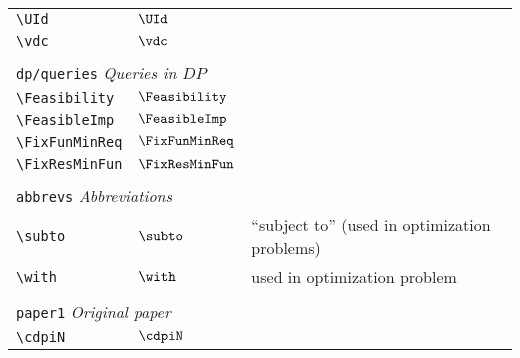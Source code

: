 \begin{longtable}{lll}
  {\color[rgb]{0.5,0.5,0.5}\texttt{\textbackslash UId}}                                                     & $\UId$                     & \\
  {\color[rgb]{0.5,0.5,0.5}\texttt{\textbackslash vdc}}                                                     & $\vdc$                     &                                                         \\
  &                            &                                                         \\
  \multicolumn{3}{l}{{\color[rgb]{0.5,0.5,0.5}\texttt{dp/queries}} \emph{Queries in $DP$}}
  \\
  \hline
  {\color[rgb]{0.5,0.5,0.5}\texttt{\textbackslash Feasibility}}                                             & $\Feasibility$             & \\
  {\color[rgb]{0.5,0.5,0.5}\texttt{\textbackslash FeasibleImp}}                                             & $\FeasibleImp$             & \\
  {\color[rgb]{0.5,0.5,0.5}\texttt{\textbackslash FixFunMinReq}}                                            & $\FixFunMinReq$            & \\
  {\color[rgb]{0.5,0.5,0.5}\texttt{\textbackslash FixResMinFun}}                                            & $\FixResMinFun$            &                                                         \\
  &                            &                                                         \\
  \multicolumn{3}{l}{{\color[rgb]{0.5,0.5,0.5}\texttt{abbrevs}} \emph{Abbreviations}}
  \\
  \hline
  \hline
  {\color[rgb]{0.5,0.5,0.5}\texttt{\textbackslash subto}}                                                   & $\subto$                   & ``subject to'' (used in optimization problems)\\
  {\color[rgb]{0.5,0.5,0.5}\texttt{\textbackslash with}}                                                    & $\with$                    & used in optimization problem                            \\
  &                            &                                                         \\
  \multicolumn{3}{l}{{\color[rgb]{0.5,0.5,0.5}\texttt{paper1}} \emph{Original paper}}
  \\
  \hline
  \hline
  {\color[rgb]{0.5,0.5,0.5}\texttt{\textbackslash cdpiN}}                                                   & $\cdpiN$                   & \\

\end{longtable}
